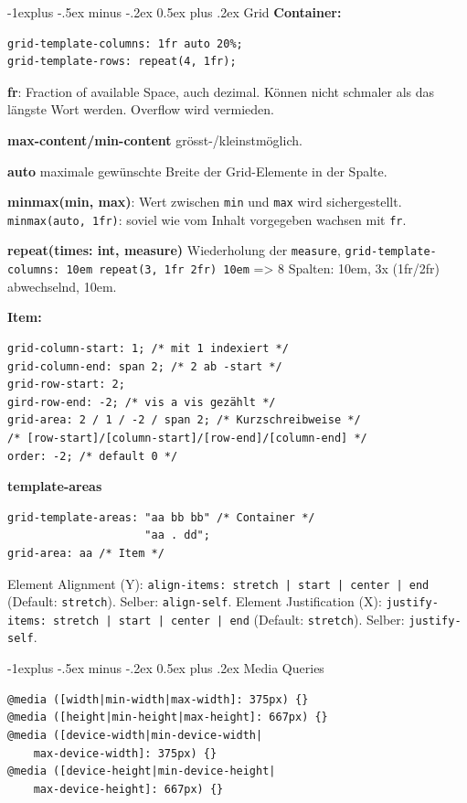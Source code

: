 \documentclass[a4paper, fontsize=6pt]{scrartcl}
\makeatletter
\renewcommand{\subsection}{\@startsection{subsection}{2}{0mm}%
    {-1explus -.5ex minus -.2ex}%
    {0.5ex plus .2ex}%
    {\normalfont\normalsize\bfseries}}
\newcommand{\css}[1]{\texttt{#1}}
\makeatother
\begin{document}
\begin{multicols*}{5}
\subsection{Grid}
\textbf{Container:} 
\begin{verbatim}
grid-template-columns: 1fr auto 20%;
grid-template-rows: repeat(4, 1fr);
\end{verbatim}

\textbf{fr}: Fraction of available Space, auch dezimal. Können nicht schmaler als das längste Wort werden. Overflow wird vermieden.

\textbf{max-content/min-content} grösst-/kleinstmöglich.

\textbf{auto} maximale gewünschte Breite der Grid-Elemente in der Spalte.

\textbf{minmax(min, max)}: Wert zwischen \css{min} und \css{max} wird sichergestellt. \css{minmax(auto, 1fr)}: soviel wie vom Inhalt vorgegeben wachsen mit \css{fr}.

\textbf{repeat(times: int, measure)} Wiederholung der \css{measure}, \css{grid-template-columns: 10em repeat(3, 1fr 2fr) 10em} => 8 Spalten: 10em, 3x (1fr/2fr) abwechselnd, 10em.

\textbf{Item:}
\begin{verbatim}
grid-column-start: 1; /* mit 1 indexiert */
grid-column-end: span 2; /* 2 ab -start */
grid-row-start: 2;
gird-row-end: -2; /* vis a vis gezählt */
grid-area: 2 / 1 / -2 / span 2; /* Kurzschreibweise */
/* [row-start]/[column-start]/[row-end]/[column-end] */
order: -2; /* default 0 */
\end{verbatim}

\textbf{template-areas}
\begin{verbatim}
grid-template-areas: "aa bb bb" /* Container */
                     "aa . dd";
grid-area: aa /* Item */
\end{verbatim}

Element Alignment (Y): \css{align-items: stretch | start | center | end} (Default: \css{stretch}). Selber: \css{align-self}. Element Justification (X): \css{justify-items: stretch | start | center | end} (Default: \css{stretch}). Selber: \css{justify-self}.


\subsection{Media Queries}
\begin{verbatim}
@media ([width|min-width|max-width]: 375px) {}
@media ([height|min-height|max-height]: 667px) {}
@media ([device-width|min-device-width|
    max-device-width]: 375px) {}
@media ([device-height|min-device-height|
    max-device-height]: 667px) {}
\end{verbatim}


\end{multicols*}
\end{document}
